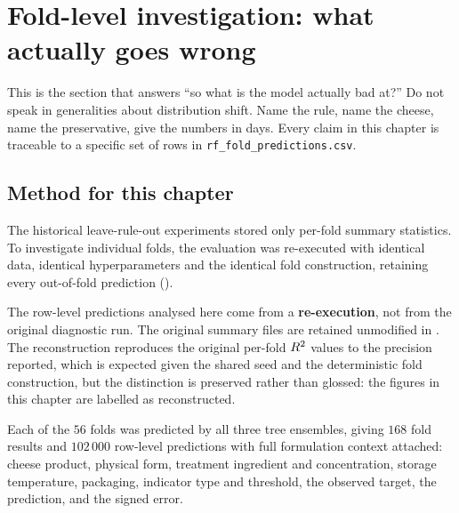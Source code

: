 \chapter{Fold-level investigation: what actually goes wrong}
\label{ch:folds}

\begin{saybox}[title={What to say at the start of this section}]
This is the section that answers ``so what is the model actually bad at?''
Do not speak in generalities about distribution shift. Name the rule, name
the cheese, name the preservative, give the numbers in days. Every claim in
this chapter is traceable to a specific set of rows in
\texttt{rf\_fold\_predictions.csv}.
\end{saybox}

\section{Method for this chapter}

The historical leave-rule-out experiments stored only per-fold summary
statistics. To investigate individual folds, the evaluation was re-executed
with identical data, identical hyperparameters and the identical fold
construction, retaining every out-of-fold prediction
().

\begin{limitbox}[title={Reconstruction, clearly labelled}]
The row-level predictions analysed here come from a \textbf{re-execution},
not from the original diagnostic run. The original summary files are
retained unmodified in
. The reconstruction
reproduces the original per-fold $R^2$ values to the precision reported,
which is expected given the shared seed and the deterministic fold
construction, but the distinction is preserved rather than glossed: the
figures in this chapter are labelled as reconstructed.
\end{limitbox}

Each of the $56$ folds was predicted by all three tree ensembles, giving
$168$ fold results and $102\,000$ row-level predictions with full
formulation context attached: cheese product, physical form, treatment
ingredient and concentration, storage temperature, packaging, indicator
type and threshold, the observed target, the prediction, and the signed
error.



